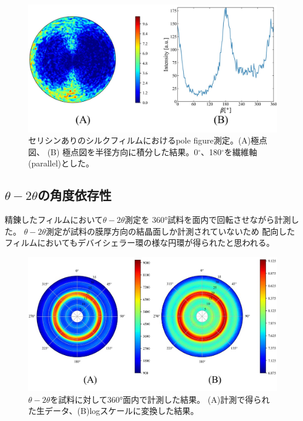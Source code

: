 \documentclass[dvipdfmx,12pt,a4paper]{jreport}
\begin{document}
			\newpage
			\begin{figure}[h]
				\centering
				\includegraphics[width=\linewidth]{セリシンあり_polefigure.jpg}
				\caption{セリシンありのシルクフィルムにおけるpole figure測定。(A)極点図、
				(B) 極点図を半径方向に積分した結果。0$^{\circ}$、180$^{\circ}$を繊維軸(parallel)とした。}
				\label{セリシン含む_pole_figure}
			\end{figure}
			\subsection{$\theta-2\theta$の角度依存性}
			精錬したフィルムにおいて$\theta-2\theta$測定を
			360°試料を面内で回転させながら計測した。
			$\theta-2\theta$測定が試料の膜厚方向の結晶面しか計測されていないため
			配向したフィルムにおいてもデバイシェラー環の様な円環が得られたと思われる。
			\begin{figure}[H]
				\centering
				\includegraphics[scale=0.9]{デバイ.jpg}
				\caption{$\theta-2\theta$を試料に対して360°面内で計測した結果。
				(A)計測で得られた生データ、(B)logスケールに変換した結果。}
			\end{figure}
			\newpage
\end{document}
